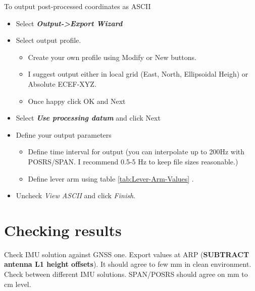 \documentclass[11pt,fleqn]{book} %
\begin{document}
To output post-processed coordinates as ASCII  	
\begin{itemize}
	\item Select \textbf{\emph{Output->Export Wizard}}
	\item Select output profile. 
	\begin{itemize}
		\item Create your own profile using Modify or New buttons.
		\item I suggest output either in local grid (East, North, Ellipsoidal Heigh) or Absolute ECEF-XYZ.
		\item Once happy click OK and Next
	\end{itemize}
	\item Select \textbf{\emph{Use processing datum}} and click Next
	\item Define your output parameters
	\begin{itemize}
		\item Define time interval for output (you can interpolate up to 200Hz with POSRS/SPAN. I recommend 0.5-5 Hz to keep file sizes reasonable.)
		\item Define lever arm using table \ref{tab:Lever-Arm-Values} . 
	\end{itemize}
	
	
	
	\item Uncheck \emph{View ASCII} and click \emph{Finish}.
\end{itemize}


\section{Checking results}
Check IMU solution against GNSS one. Export values at ARP (\textbf{SUBTRACT antenna L1 height offsets}). It should agree to few mm in clean environment.  Check between different IMU solutions. SPAN/POSRS should agree on mm to cm level.
\end{document}
